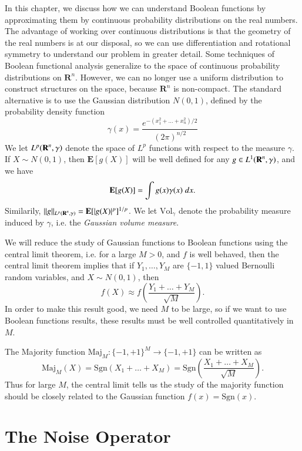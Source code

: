 In this chapter, we discuss how we can understand Boolean functions by approximating them by continuous probability distributions on the real numbers. The advantage of working over continuous distributions is that the geometry of the real numbers is at our disposal, so we can use differentiation and rotational symmetry to understand our problem in greater detail. Some techniques of Boolean functional analysis generalize to the space of continuous probability distributions on $\mathbf{R}^n$. However, we can no longer use a uniform distribution to construct structures on the space, because $\mathbf{R}^n$ is non-compact. The standard alternative is to use the Gaussian distribution $N(0,1)$, defined by the probability density function
%
\[ \gamma(x) = \frac{e^{-(x_1^2 + \dots + x_n^2)/2}}{(2 \pi)^{n/2}} \]
%
We let $L^p(\operatorname{\mathbf{R}}^n, \gamma)$ denote the space of $L^p$ functions with respect to the measure $\gamma$. If $X \sim N(0,1)$, then $\mathbf{E}[g(X)]$ will be well defined for any $g \in L^1(\operatorname{\mathbf{R}}^n, \gamma)$, and we have
%
\[ \operatorname{\mathbf{E}}[g(X)] = \int g(x) \gamma(x)\; dx. \]
%
Similarily, $\| g \|_{L^p(\operatorname{\mathbf{R}}^n,\gamma)} = \mathbf{E}[|g(X)|^p]^{1/p}$. We let $\text{Vol}_\gamma$ denote the probability measure induced by $\gamma$, i.e. the \emph{Gaussian volume measure}.

We will reduce the study of Gaussian functions to Boolean functions using the central limit theorem, i.e. for a large $M > 0$, and $f$ is well behaved, then the central limit theorem implies that if $Y_1,\dots,Y_M$ are $\{ -1, 1 \}$ valued Bernoulli random variables, and $X \sim N(0,1)$, then
%
\[ f(X) \approx f \left( \frac{Y_1 + \dots + Y_M}{\sqrt{M}} \right). \]
%
In order to make this result good, we need $M$ to be large, so if we want to use Boolean functions results, these results must be well controlled quantitatively in $M$.

\begin{example}
    The Majority function $\text{Maj}_M: \{ -1, +1 \}^M \to \{ -1, +1 \}$ can be written as
    \[ \text{Maj}_M(X) = \text{Sgn}(X_1 + \dots + X_M) = \text{Sgn} \left( \frac{X_1 + \dots + X_M}{\sqrt{M}} \right). \]
    Thus for large $M$, the central limit tells us the study of the majority function should be closely related to the Gaussian function $f(x) = \text{Sgn}(x)$.
\end{example}

\section{The Noise Operator}

